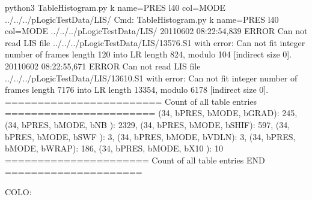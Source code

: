 \documentclass[letterpaper,10pt,english]{sphinxmanual}
\begin{document}
\begin{sphinxVerbatim}[commandchars=\\\{\}]
\PYGZdl{} python3 TableHistogram.py \PYGZhy{}k \PYGZhy{}\PYGZhy{}name=PRES \PYGZhy{}l40 \PYGZhy{}\PYGZhy{}col=MODE ../../../pLogicTestData/LIS/
Cmd: TableHistogram.py \PYGZhy{}k \PYGZhy{}\PYGZhy{}name=PRES \PYGZhy{}l40 \PYGZhy{}\PYGZhy{}col=MODE ../../../pLogicTestData/LIS/
2011\PYGZhy{}06\PYGZhy{}02 08:22:54,839 ERROR    Can not read LIS file ../../../pLogicTestData/LIS/13576.S1 with error: Can not fit integer number of frames length 120 into LR length 824, modulo 104 [indirect size 0].
2011\PYGZhy{}06\PYGZhy{}02 08:22:55,671 ERROR    Can not read LIS file ../../../pLogicTestData/LIS/13610.S1 with error: Can not fit integer number of frames length 7176 into LR length 13354, modulo 6178 [indirect size 0].
======================== Count of all table entries =======================
\PYGZob{}\PYGZdq{}(34, b\PYGZsq{}PRES\PYGZsq{}, b\PYGZsq{}MODE\PYGZsq{}, b\PYGZsq{}GRAD\PYGZsq{})\PYGZdq{}: 245,
 \PYGZdq{}(34, b\PYGZsq{}PRES\PYGZsq{}, b\PYGZsq{}MODE\PYGZsq{}, b\PYGZsq{}NB  \PYGZsq{})\PYGZdq{}: 2329,
 \PYGZdq{}(34, b\PYGZsq{}PRES\PYGZsq{}, b\PYGZsq{}MODE\PYGZsq{}, b\PYGZsq{}SHIF\PYGZsq{})\PYGZdq{}: 597,
 \PYGZdq{}(34, b\PYGZsq{}PRES\PYGZsq{}, b\PYGZsq{}MODE\PYGZsq{}, b\PYGZsq{}SWF \PYGZsq{})\PYGZdq{}: 3,
 \PYGZdq{}(34, b\PYGZsq{}PRES\PYGZsq{}, b\PYGZsq{}MODE\PYGZsq{}, b\PYGZsq{}VDLN\PYGZsq{})\PYGZdq{}: 3,
 \PYGZdq{}(34, b\PYGZsq{}PRES\PYGZsq{}, b\PYGZsq{}MODE\PYGZsq{}, b\PYGZsq{}WRAP\PYGZsq{})\PYGZdq{}: 186,
 \PYGZdq{}(34, b\PYGZsq{}PRES\PYGZsq{}, b\PYGZsq{}MODE\PYGZsq{}, b\PYGZsq{}X10 \PYGZsq{})\PYGZdq{}: 10\PYGZcb{}
====================== Count of all table entries END =====================
\end{sphinxVerbatim}

COLO:
\end{document}
